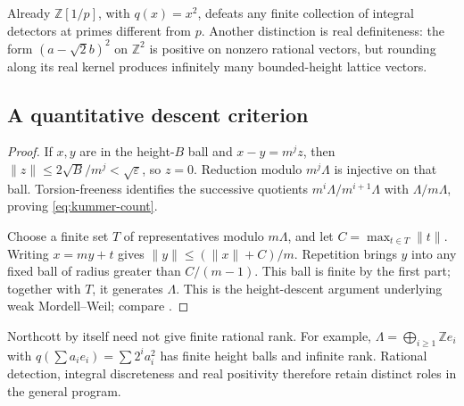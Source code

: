 \documentclass[11pt,a4paper]{article}
\newtheorem{theorem}{Theorem}[section]
\theoremstyle{definition}
\DeclareRobustCommand{\MathEqref}[1]{\begingroup\hypersetup{linkcolor=MathEquationLink}\eqref{#1}\endgroup}
\newcommand{\Z}{\mathbb Z}\newcommand{\A}{\mathbb A}\newcommand{\Fbar}{\overline F}
\numberwithin{equation}{section}
\begin{document}
Already \(\Z[1/p]\), with \(q(x)=x^2\), defeats any finite
collection of integral detectors at primes different from \(p\).
Another distinction is real definiteness: the form
\((a-\sqrt2b)^2\) on \(\Z^2\) is positive on nonzero rational
vectors, but rounding along its real kernel produces infinitely
many bounded-height lattice vectors.

\subsection{A quantitative descent criterion}\label{sec:weak-mw}


\begin{proof}
If \(x,y\) are in the height-\(B\) ball and
\(x-y=m^jz\), then
\(\|z\|\le2\sqrt B/m^j<\sqrt\varepsilon\), so \(z=0\).
Reduction modulo \(m^j\Lambda\) is injective on that ball.
Torsion-freeness identifies the successive quotients
\(m^i\Lambda/m^{i+1}\Lambda\) with \(\Lambda/m\Lambda\),
proving \MathEqref{eq:kummer-count}.

Choose a finite set \(T\) of representatives modulo
\(m\Lambda\), and let \(C=\max_{t\in T}\|t\|\).
Writing \(x=my+t\) gives
\(\|y\|\le(\|x\|+C)/m\). Repetition brings \(y\) into
any fixed ball of radius greater than \(C/(m-1)\). This ball
is finite by the first part; together with \(T\), it generates
\(\Lambda\). This is the height-descent argument underlying
weak Mordell--Weil; compare \cite[Section~10.3]{ConradFeng}.
\end{proof}

Northcott by itself need not give finite rational rank. For example,
\(\Lambda=\bigoplus_{i\ge1}\Z e_i\) with
\(q(\sum a_ie_i)=\sum2^ia_i^2\) has finite height balls and
infinite rank. Rational detection, integral discreteness and real
positivity therefore retain distinct roles in the general program.
\end{document}
